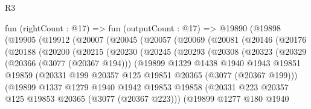 \begin{lexlean}{R3}
\begin{coremodule}
      fun (rightCount : @17) =>
      fun (outputCount : @17) =>
      @19890
        (@19898
          (@19905
            (@19912
              (@20007
                (@20045
                  (@20057
                    (@20069
                      (@20081
                        (@20146
                          (@20176
                            (@20188
                              (@20200
                                (@20215
                                  (@20230
                                    (@20245
                                      (@20293
                                        (@20308
                                          (@20323
                                            (@20329
                                              (@20366 (@3077 (@20367 @194)))
                                              (@19899
                                                @1329
                                                @1438
                                                @1940
                                                @1943
                                                @19851
                                                @19859
                                                (@20331
                                                  @199
                                                  @20357
                                                  @125
                                                  @19851
                                                  @20365
                                                  (@3077 (@20367 @199)))
                                                (@19899
                                                  @1337
                                                  @1279
                                                  @1940
                                                  @1942
                                                  @19853
                                                  @19858
                                                  (@20331
                                                    @223
                                                    @20357
                                                    @125
                                                    @19853
                                                    @20365
                                                    (@3077 (@20367 @223)))
                                                  (@19899
                                                    @1277
                                                    @180
                                                    @1940

\end{coremodule}
\end{lexlean}
